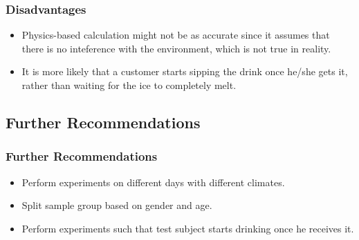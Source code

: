 \documentclass[compress,handout,10pt]{beamer}
\let\olditem\item
\renewcommand{\item}{\setlength{\itemsep}{0.5\baselineskip}\olditem}
\begin{document}
\begin{frame}
    \frametitle{Disadvantages}

\begin{itemize}

\item Physics-based calculation might not be as accurate since it assumes that there is no inteference with the environment, which is not true in reality.
\item It is more likely that a customer starts sipping the drink once he/she gets it, rather than waiting for the ice to completely melt.
\end{itemize}

\end{frame}

\subsection{Further Recommendations}
\begin{frame}
    \frametitle{Further Recommendations}
\begin{itemize}
\item Perform experiments on different days with different climates.
\item Split sample group based on gender and age.
\item Perform experiments such that test subject starts drinking once he receives it.
\end{itemize}
\end{frame}
\end{document}
